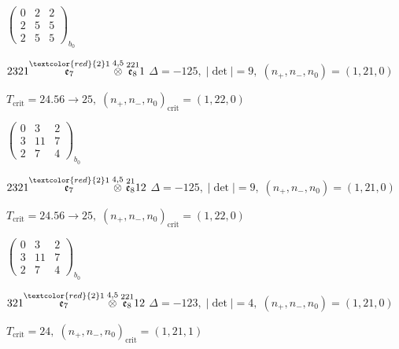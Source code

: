 \documentclass[10pt]{article}
\begin{document}
\hspace{2em}$\left(\begin{smallmatrix}0 & 2 & 2 \\ 2 & 5 & 5 \\ 2 & 5 & 5\end{smallmatrix}\right)_{\!b_0}$

\smallskip

$2321\overset{\textcolor{red}{2}1}{\mathfrak{e}_7}\overset{4,5}{\otimes}\overset{221}{\mathfrak{e}_8}1$ \quad $\Delta=-125,\; |\det|=9,\; (n_+,n_-,n_0)=(1,21,0)$

\hspace{1em}$T_{\text{crit}}=24.56 \to 25,\; (n_+,n_-,n_0)_{\text{crit}}=(1,22,0)$

\hspace{2em}$\left(\begin{smallmatrix}0 & 3 & 2 \\ 3 & 11 & 7 \\ 2 & 7 & 4\end{smallmatrix}\right)_{\!b_0}$

\smallskip

$2321\overset{\textcolor{red}{2}1}{\mathfrak{e}_7}\overset{4,5}{\otimes}\overset{21}{\mathfrak{e}_8}12$ \quad $\Delta=-125,\; |\det|=9,\; (n_+,n_-,n_0)=(1,21,0)$

\hspace{1em}$T_{\text{crit}}=24.56 \to 25,\; (n_+,n_-,n_0)_{\text{crit}}=(1,22,0)$

\hspace{2em}$\left(\begin{smallmatrix}0 & 3 & 2 \\ 3 & 11 & 7 \\ 2 & 7 & 4\end{smallmatrix}\right)_{\!b_0}$

\smallskip

$321\overset{\textcolor{red}{2}1}{\mathfrak{e}_7}\overset{4,5}{\otimes}\overset{221}{\mathfrak{e}_8}12$ \quad $\Delta=-123,\; |\det|=4,\; (n_+,n_-,n_0)=(1,21,0)$

\hspace{1em}$T_{\text{crit}}=24,\; (n_+,n_-,n_0)_{\text{crit}}=(1,21,1)$
\end{document}
